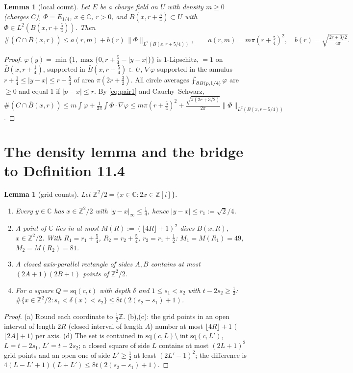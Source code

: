 \documentclass[11pt]{article}
\newtheorem{lemma}[theorem]{Lemma}
\theoremstyle{definition}
\theoremstyle{remark}
\newcommand{\C}{\mathbb C}
\newcommand{\Z}{\mathbb Z}
\newcommand{\dep}{\delta}
\newcommand{\sq}{\mathrm{sq}}
\newcommand{\avg}{\fint}
\def\fint{\mathop{\,\rlap{--}\!\!\int}\nolimits}
\begin{document}
\begin{lemma}[local count]\label{lem:localcount}
Let $E$ be a charge field on $U$ with density $m\ge0$ (charges $C$), $\Phi=E_{1/4}$, $x\in\C$, $r>0$, and $\bar B(x,r+\frac54)\subset U$ with
$\Phi\in L^2(B(x,r+\frac54))$. Then
\[
\#(C\cap\bar B(x,r))\le a(r,m)+b(r)\,\|\Phi\|_{L^2(B(x,r+5/4))},\qquad a(r,m)=m\pi(r+\tfrac54)^2,\quad b(r)=\sqrt{\tfrac{2r+3/2}{4\pi}} .
\]
\end{lemma}
\begin{proof}
$\varphi(y)=\min\{1,\max\{0,r+\frac54-|y-x|\}\}$ is $1$-Lipschitz, $=1$ on $\bar B(x,r+\frac14)$, supported in $\bar B(x,r+\frac54)\subset U$,
$\nabla\varphi$ supported in the annulus $r+\frac14\le|y-x|\le r+\frac54$ of area $\pi(2r+\frac32)$. All circle averages
$\avg_{\partial B(p,1/4)}\varphi$ are $\ge0$ and equal $1$ if $|p-x|\le r$. By \eqref{eq:pair1} and Cauchy--Schwarz,
$\#(C\cap\bar B(x,r))\le m\int\varphi+\frac1{2\pi}\int\Phi\cdot\nabla\varphi\le m\pi(r+\frac54)^2+\frac{\sqrt{\pi(2r+3/2)}}{2\pi}\|\Phi\|_{L^2(B(x,r+5/4))}$.
\end{proof}

\section{The density lemma and the bridge to Definition 11.4}\label{sec:density}

\begin{lemma}[grid counts]\label{lem:grid}
Let $\Z^2/2=\{x\in\C:2x\in\Z[i]\}$.
\begin{enumerate}[label=(\alph*)]
\item Every $y\in\C$ has $x\in\Z^2/2$ with $|y-x|_\infty\le\frac14$, hence $|y-x|\le r_1:=\sqrt2/4$.
\item A point of $\C$ lies in at most $M(R):=(\lfloor4R\rfloor+1)^2$ discs $B(x,R)$, $x\in\Z^2/2$. With $R_1=r_1+\frac54$,
  $R_2=r_2+\frac54$, $r_2=r_1+\frac12$: $M_1=M(R_1)=49$, $M_2=M(R_2)=81$.
\item A closed axis-parallel rectangle of sides $A,B$ contains at most $(2A+1)(2B+1)$ points of $\Z^2/2$.
\item For a square $Q=\sq(c,t)$ with depth $\dep$ and $1\le s_1<s_2$ with $t-2s_2\ge\frac12$:
  $\#\{x\in\Z^2/2:s_1<\dep(x)<s_2\}\le8t(2(s_2-s_1)+1)$.
\end{enumerate}
\end{lemma}
\begin{proof}
(a) Round each coordinate to $\frac12\Z$. (b),(c): the grid points in an open interval of length $2R$ (closed interval of length $A$)
number at most $\lfloor4R\rfloor+1$ ($\lfloor2A\rfloor+1$) per axis. (d) The set is contained in $\sq(c,L)\setminus\operatorname{int}\sq(c,L')$,
$L=t-2s_1$, $L'=t-2s_2$; a closed square of side $L$ contains at most $(2L+1)^2$ grid points and an open one of side $L'\ge\frac12$ at
least $(2L'-1)^2$; the difference is $4(L-L'+1)(L+L')\le8t(2(s_2-s_1)+1)$.
\end{proof}
\end{document}
